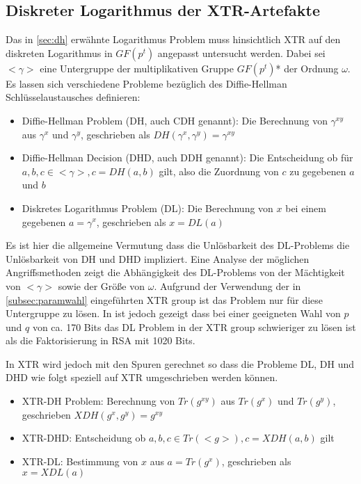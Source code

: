\documentclass[10pt,        %
               a4paper,     %
               journal,     %
               ]{IEEEtran}
\begin{document}
\subsection{Diskreter Logarithmus der XTR-Artefakte}
Das in \ref{sec:dh} erwähnte Logarithmus Problem muss hinsichtlich XTR auf den diskreten Logarithmus in $GF(p^t)$ angepasst untersucht werden.
Dabei sei $<\gamma>$ eine Untergruppe der multiplikativen Gruppe $GF(p^t)$* der Ordnung $\omega$. Es lassen sich verschiedene Probleme bezüglich des Diffie-Hellman Schlüsselaustausches definieren:

\begin{itemize}
\item Diffie-Hellman Problem (DH, auch CDH genannt): Die Berechnung von $\gamma^{xy}$ aus $\gamma^x$ und $\gamma^y$, geschrieben als $DH(\gamma^x,\gamma^y) = \gamma^{xy}$
\item Diffie-Hellman Decision (DHD, auch DDH genannt): Die Entscheidung ob für $a,b,c \in <\gamma> , c=DH(a,b)$ gilt, also die Zuordnung von $c$ zu gegebenen $a$ und $b$
\item Diskretes Logarithmus Problem (DL): Die Berechnung von $x$ bei einem gegebenen $a = \gamma^x$, geschrieben als $x=DL(a)$
\end{itemize}
Es ist hier die allgemeine Vermutung dass die Unlösbarkeit des DL-Problems die Unlösbarkeit von DH und DHD impliziert.
Eine Analyse der möglichen Angriffsmethoden zeigt die Abhängigkeit des DL-Problems von der Mächtigkeit von $<\gamma>$ sowie der Größe von $\omega$. Aufgrund der Verwendung der in \ref{subsec:paramwahl} eingeführten XTR group ist das Problem nur für diese Untergruppe zu lösen.
In \cite{xtr-explanation} ist jedoch gezeigt dass bei einer geeigneten Wahl von $p$ und $q$ von ca. 170 Bits das DL Problem in der XTR group schwieriger zu lösen ist als die Faktorisierung in RSA mit 1020 Bits.

In XTR wird jedoch mit den Spuren gerechnet so dass die Probleme DL, DH und DHD wie folgt speziell auf XTR umgeschrieben werden können.

\begin{itemize}
\item XTR-DH Problem: Berechnung von $Tr(g^{xy})$ aus $Tr(g^x)$ und $Tr(g^y)$, geschrieben $XDH(g^x, g^y) = g^{xy}$
\item XTR-DHD: Entscheidung ob $a,b,c \in Tr(<g>) , c=XDH(a,b)$ gilt
\item XTR-DL: Bestimmung von $x$ aus $a = Tr(g^x)$, geschrieben als $x = XDL(a)$
\end{itemize}
\end{document}
